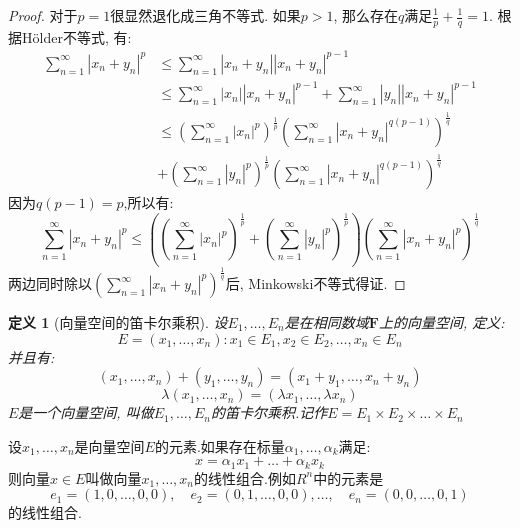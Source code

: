 \documentclass[a4paper,11pt]{article}
\newtheorem{definition}{\hspace{2em}定义}[section]
\newtheorem{proof}{证明}[section]
\begin{document}
\begin{proof}
  对于$p=1$很显然退化成三角不等式. 如果$p>1$, 那么存在$q$满足$\frac{1}{p}+\frac{1}{q}=1$. 根据H\"{o}lder不等式, 有:
  \begin{equation*}
  \begin{split}
     \sum_{n=1}^{\infty}|x_n+y_n|^p&\leq\sum_{n=1}^{\infty}|x_n+y_n||x_n+y_n|^{p-1}\\
       &\leq\sum_{n=1}^{\infty}|x_n||x_n+y_n|^{p-1}+\sum_{n=1}^{\infty}|y_n||x_n+y_n|^{p-1}\\
       &\leq(\sum_{n=1}^{\infty}|x_n|^p)^\frac{1}{p}(\sum_{n=1}^{\infty}|x_n+y_n|^{q(p-1)})^\frac{1}{q}\\
       &+(\sum_{n=1}^{\infty}|y_n|^p)^\frac{1}{p}(\sum_{n=1}^{\infty}|x_n+y_n|^{q(p-1)})^\frac{1}{q}
  \end{split}
  \end{equation*}
  因为$q(p-1)=p$,所以有:
  \begin{equation*}
    \sum_{n=1}^{\infty}|x_n+y_n|^p\leq ((\sum_{n=1}^{\infty}|x_n|^p)^\frac{1}{p}+(\sum_{n=1}^{\infty}|y_n|^p)^\frac{1}{p})(\sum_{n=1}^{\infty}|x_n+y_n|^{p})^\frac{1}{q}
  \end{equation*}
  两边同时除以$(\sum_{n=1}^{\infty}|x_n+y_n|^p)^{\frac{1}{q}}$后, Minkowski不等式得证.
\end{proof}
\begin{definition}[向量空间的笛卡尔乘积]
  设$E_1,\dots,E_n$是在相同数域$\mathbf{F}$上的向量空间, 定义:
  \begin{equation*}
    E={(x_1,\dots,x_n):x_1\in E_1,x_2\in E_2,\dots,x_n\in E_n}
  \end{equation*}
  并且有:
  \begin{equation*}
    (x_1,\dots,x_n)+(y_1,\dots,y_n)=(x_1+y_1,\dots,x_n+y_n)
  \end{equation*}
  \begin{equation*}
    \lambda(x_1,\dots,x_n)=(\lambda x_1,\dots,\lambda x_n)
  \end{equation*}
  $E$是一个向量空间, 叫做$E_1,\dots,E_n$的笛卡尔乘积.记作$E=E_1\times E_2\times\dots\times E_n$
\end{definition}
设$x_1,\dots,x_n$是向量空间$E$的元素.如果存在标量$\alpha_1,\dots,\alpha_k$满足:
\begin{equation*}
  x=\alpha_1x_1+\dots+\alpha_kx_k
\end{equation*}
则向量$x\in E$叫做向量$x_1,\dots,x_n$的线性组合.例如$R^n$中的元素是
\begin{equation*}
  e_1=(1,0,\dots,0,0),\quad e_2=(0,1,\dots,0,0),\dots,\quad e_n=(0,0,\dots,0,1)
\end{equation*}
的线性组合.
\end{document}
